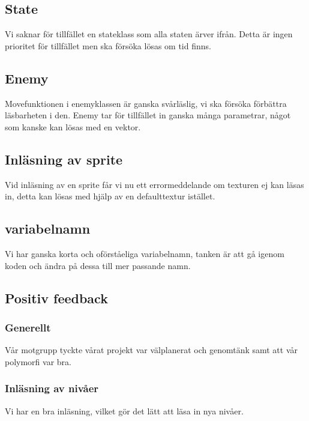 \documentclass{TDP005mall}
\begin{document}
\subsection{State}
Vi saknar för tillfället en stateklass som alla staten ärver ifrån. Detta är
ingen prioritet för tillfället men ska försöka lösas om tid finns.

\subsection{Enemy}
Movefunktionen i enemyklassen är ganska svårläslig, vi ska försöka förbättra
läsbarheten i den.
Enemy tar för tillfället in ganska många parametrar, något som kanske kan lösas
med en vektor.

\subsection{Inläsning av sprite}
Vid inläsning av en sprite får vi nu ett errormeddelande om texturen ej kan
läsas in, detta kan lösas med hjälp av en defaulttextur istället.

\subsection{variabelnamn}
Vi har ganska korta och oförståeliga variabelnamn, tanken är att gå igenom koden
och ändra på dessa till mer passande namn.

\subsection{Positiv feedback}

\subsubsection{Generellt}
Vår motgrupp tyckte vårat projekt var välplanerat och genomtänk samt att vår
polymorfi var bra.

\subsubsection{Inläsning av nivåer}
Vi har en bra inläsning, vilket gör det lätt att läsa in nya nivåer.
\end{document}
